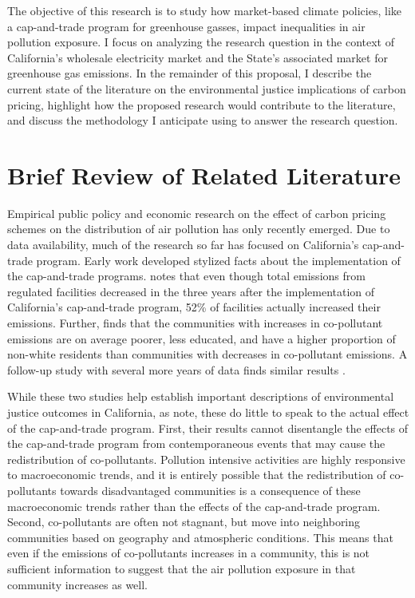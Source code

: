 \documentclass[11pt]{article}
\begin{document}
The objective of this research is to study how market-based climate policies, like a cap-and-trade program for greenhouse gasses, impact inequalities in air pollution exposure. I focus on analyzing the research question in the context of California's wholesale electricity market and the State's associated market for greenhouse gas emissions. In the remainder of this proposal, I describe the current state of the literature on the environmental justice implications of carbon pricing, highlight how the proposed research would contribute to the literature, and discuss the methodology I anticipate using to answer the research question.


\section*{Brief Review of Related Literature}

Empirical public policy and economic research on the effect of carbon pricing schemes on the distribution of air pollution has only recently emerged. Due to data availability, much of the research so far has focused on California's cap-and-trade program. Early work developed stylized facts about the implementation of the cap-and-trade programs. \cite{cushing2018carbon} notes that even though total emissions from regulated facilities decreased in the three years after the implementation of California's cap-and-trade program, 52\% of facilities actually increased their emissions. Further, \cite{cushing2018carbon} finds that the communities with increases in co-pollutant emissions are on average poorer, less educated, and have a higher proportion of non-white residents than communities with decreases in co-pollutant emissions. A follow-up study with several more years of data finds similar results \citep{pastor2022up}. 

While these two studies help establish important descriptions of environmental justice outcomes in California, as \cite{hernandez2022importance} note, these do little to speak to the actual effect of the cap-and-trade program. First, their results cannot disentangle the effects of the cap-and-trade program from contemporaneous events that may cause the redistribution of co-pollutants. Pollution intensive activities are highly responsive to macroeconomic trends, and it is entirely possible that the redistribution of co-pollutants towards disadvantaged communities is a consequence of these macroeconomic trends rather than the effects of the cap-and-trade program. Second, co-pollutants are often not stagnant, but move into neighboring communities based on geography and atmospheric conditions. This means that even if the emissions of co-pollutants increases in a community, this is not sufficient information to suggest that the air pollution exposure in that community increases as well. 
\end{document}
